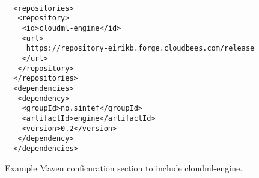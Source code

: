 \begin{figure}[tb]
  \begin{center}
    \begin{verbatim}

  <repositories>
   <repository>
    <id>cloudml-engine</id>
    <url>
     https://repository-eirikb.forge.cloudbees.com/release
    </url>
   </repository>
  </repositories>
  <dependencies>
   <dependency>
    <groupId>no.sintef</groupId>
    <artifactId>engine</artifactId>
    <version>0.2</version>
   </dependency>
  </dependencies>
    \end{verbatim}
  \end{center}
  \caption{Example Maven conficuration section to include cloudml-engine.}
  \label{fig:pom-example}
\end{figure}

